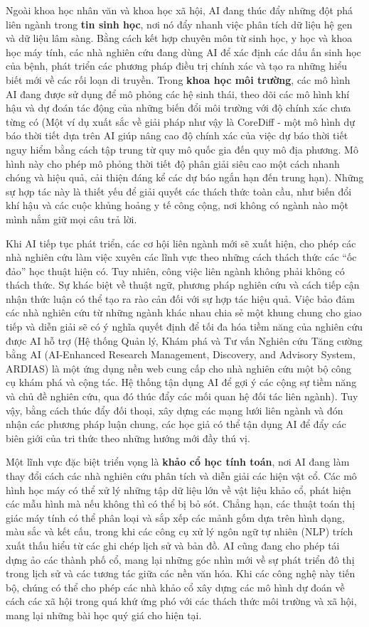 Ngoài khoa học nhân văn và khoa học xã hội, AI đang thúc đẩy những đột phá liên ngành trong \textbf{tin sinh học}, nơi nó đẩy nhanh việc phân tích dữ liệu hệ gen và dữ liệu lâm sàng. Bằng cách kết hợp chuyên môn từ sinh học, y học và khoa học máy tính, các nhà nghiên cứu đang dùng AI để xác định các dấu ấn sinh học của bệnh, phát triển các phương pháp điều trị chính xác và tạo ra những hiểu biết mới về các rối loạn di truyền. Trong \textbf{khoa học môi trường}, các mô hình AI đang được sử dụng để mô phỏng các hệ sinh thái, theo dõi các mô hình khí hậu và dự đoán tác động của những biến đổi môi trường với độ chính xác chưa từng có (Một ví dụ xuất sắc về giải pháp như vậy là CoreDiff - một mô hình dự báo thời tiết dựa trên AI giúp nâng cao độ chính xác của việc dự báo thời tiết nguy hiểm bằng cách tập trung từ quy mô quốc gia đến quy mô địa phương. Mô hình này cho phép mô phỏng thời tiết độ phân giải siêu cao một cách nhanh chóng và hiệu quả, cải thiện đáng kể các dự báo ngắn hạn đến trung hạn). Những sự hợp tác này là thiết yếu để giải quyết các thách thức toàn cầu, như biến đổi khí hậu và các cuộc khủng hoảng y tế công cộng, nơi không có ngành nào một mình nắm giữ mọi câu trả lời.

Khi AI tiếp tục phát triển, các cơ hội liên ngành mới sẽ xuất hiện, cho phép các nhà nghiên cứu làm việc xuyên các lĩnh vực theo những cách thách thức các ``ốc đảo'' học thuật hiện có. Tuy nhiên, công việc liên ngành không phải không có thách thức. Sự khác biệt về thuật ngữ, phương pháp nghiên cứu và cách tiếp cận nhận thức luận có thể tạo ra rào cản đối với sự hợp tác hiệu quả. Việc bảo đảm các nhà nghiên cứu từ những ngành khác nhau chia sẻ một khung chung cho giao tiếp và diễn giải sẽ có ý nghĩa quyết định để tối đa hóa tiềm năng của nghiên cứu được AI hỗ trợ (Hệ thống Quản lý, Khám phá và Tư vấn Nghiên cứu Tăng cường bằng AI (AI-Enhanced Research Management, Discovery, and Advisory System, ARDIAS) là một ứng dụng nền web cung cấp cho nhà nghiên cứu một bộ công cụ khám phá và cộng tác. Hệ thống tận dụng AI để gợi ý các cộng sự tiềm năng và chủ đề nghiên cứu, qua đó thúc đẩy các mối quan hệ đối tác liên ngành). Tuy vậy, bằng cách thúc đẩy đối thoại, xây dựng các mạng lưới liên ngành và đón nhận các phương pháp luận chung, các học giả có thể tận dụng AI để đẩy các biên giới của tri thức theo những hướng mới đầy thú vị.

Một lĩnh vực đặc biệt triển vọng là \textbf{khảo cổ học tính toán}, nơi AI đang làm thay đổi cách các nhà nghiên cứu phân tích và diễn giải các hiện vật cổ. Các mô hình học máy có thể xử lý những tập dữ liệu lớn về vật liệu khảo cổ, phát hiện các mẫu hình mà nếu không thì có thể bị bỏ sót. Chẳng hạn, các thuật toán thị giác máy tính có thể phân loại và sắp xếp các mảnh gốm dựa trên hình dạng, màu sắc và kết cấu, trong khi các công cụ xử lý ngôn ngữ tự nhiên (NLP) trích xuất thấu hiểu từ các ghi chép lịch sử và bản đồ. AI cũng đang cho phép tái dựng ảo các thành phố cổ, mang lại những góc nhìn mới về sự phát triển đô thị trong lịch sử và các tương tác giữa các nền văn hóa. Khi các công nghệ này tiến bộ, chúng có thể cho phép các nhà khảo cổ xây dựng các mô hình dự đoán về cách các xã hội trong quá khứ ứng phó với các thách thức môi trường và xã hội, mang lại những bài học quý giá cho hiện tại.

